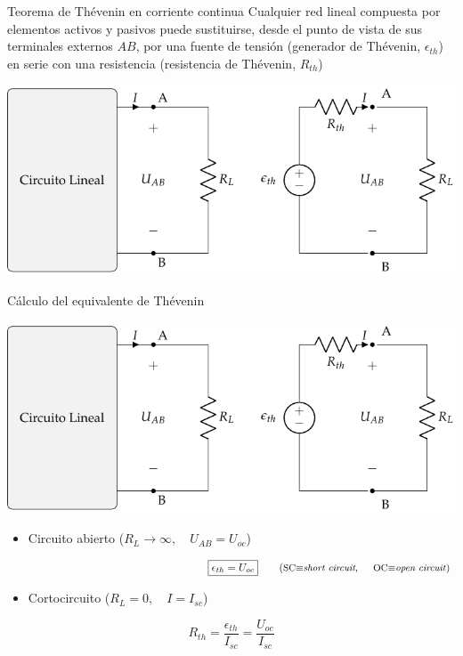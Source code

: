 \documentclass[aspectratio=169, xcolor={usenames,svgnames,dvipsnames}]{beamer}
\begin{document}

\begin{frame}{Teorema de Thévenin en corriente continua}
    Cualquier \alert{red lineal} compuesta por elementos activos y pasivos \alert{puede sustituirse}, desde el punto de vista de sus terminales externos $AB$, por una \alert{fuente de tensión} (generador de Thévenin, \(\epsilon_{th}\)) en \alert{serie} con una \alert{resistencia} (resistencia de Thévenin, \(R_{th}\))
    
    \begin{center}
        \includegraphics[height=0.6\textheight]{../figs/EquivalenteThevenin_R.pdf}
    \end{center}
\end{frame}


\begin{frame}{Cálculo del equivalente de Thévenin}
    \begin{center}
    \includegraphics[height=0.43\textheight]{../figs/EquivalenteThevenin_R.pdf}
    \end{center}
    
    \begin{itemize}
    \item Circuito abierto (\(R_L \to \infty, \quad U_{AB} = U_{oc}\))
    \end{itemize}
    \[
    \hspace{65mm}
    \boxed{\epsilon_{th} = U_{oc}} 
    \qquad \textrm{(\small{SC$\equiv$\textit{short circuit}, \hspace*{4mm}OC$\equiv$\textit{open circuit}})}
    \] 
    \vspace{-3mm}
    \begin{itemize}
    \item Cortocircuito (\(R_L = 0, \quad I = I_{sc}\))
    \end{itemize}
    \[
    \boxed{R_{th} = \frac{\epsilon_{th}}{I_{sc}} = \frac{U_{oc}}{I_{sc}}}
    \]
\end{frame}
\end{document}
